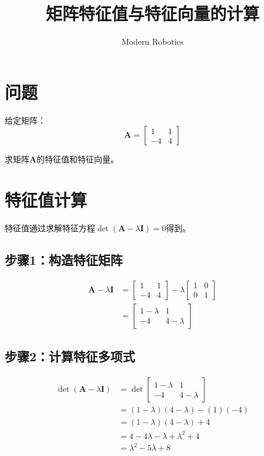 \documentclass[12pt,a4paper]{article}
\title{矩阵特征值与特征向量的计算}
\author{Modern Robotics}
\date{}
\begin{document}
\maketitle

\section{问题}

给定矩阵：
\begin{equation}
\bm{A} = \begin{bmatrix} 1 & 1 \\ -4 & 4 \end{bmatrix}
\end{equation}

求矩阵$\bm{A}$的特征值和特征向量。

\section{特征值计算}

特征值通过求解特征方程$\det(\bm{A} - \lambda \bm{I}) = 0$得到。

\subsection{步骤1：构造特征矩阵}

\begin{align}
\bm{A} - \lambda \bm{I} &= \begin{bmatrix} 1 & 1 \\ -4 & 4 \end{bmatrix} - \lambda \begin{bmatrix} 1 & 0 \\ 0 & 1 \end{bmatrix} \\
&= \begin{bmatrix} 1 - \lambda & 1 \\ -4 & 4 - \lambda \end{bmatrix}
\end{align}

\subsection{步骤2：计算特征多项式}

\begin{align}
\det(\bm{A} - \lambda \bm{I}) &= \det\begin{bmatrix} 1 - \lambda & 1 \\ -4 & 4 - \lambda \end{bmatrix} \\
&= (1 - \lambda)(4 - \lambda) - (1)(-4) \\
&= (1 - \lambda)(4 - \lambda) + 4 \\
&= 4 - 4\lambda - \lambda + \lambda^2 + 4 \\
&= \lambda^2 - 5\lambda + 8
\end{align}
\end{document}
